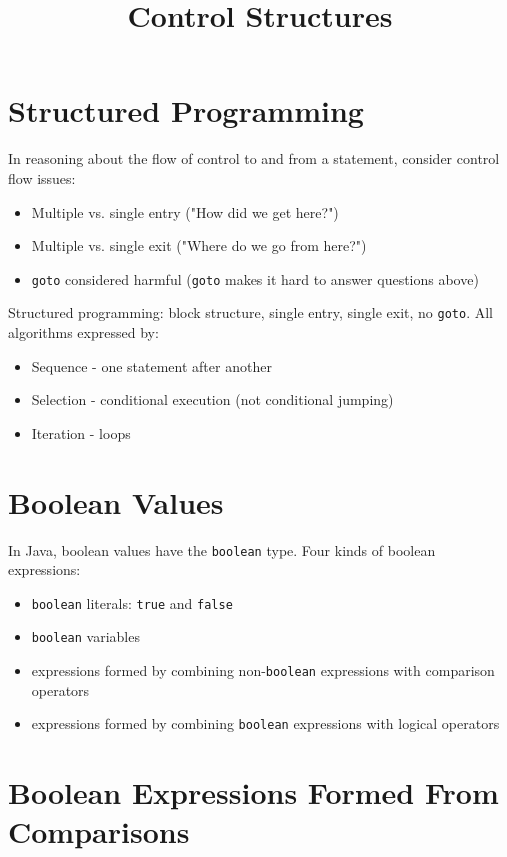 \documentclass{article}
\title{Control Structures}
\date{}
\begin{document}
\maketitle

\section{Structured Programming}


In reasoning about the flow of control to and from a statement, consider control flow issues:
\begin{itemize}
\item Multiple vs. single entry ("How did we get here?")
\item Multiple vs. single exit ("Where do we go from here?")
\item {\tt goto} considered harmful ({\tt goto} makes it hard to answer questions above)
\end{itemize}

Structured programming: block structure, single entry, single exit, no {\tt goto}.  All algorithms expressed by:
\begin{itemize}
\item Sequence - one statement after another
\item Selection - conditional execution (not conditional jumping)
\item Iteration - loops
\end{itemize}


\section{Boolean Values}


In Java, boolean values have the {\tt boolean} type.  Four kinds of boolean expressions:
\begin{itemize}
\item {\tt boolean} literals: {\tt true} and {\tt false}
\item {\tt boolean} variables
\item expressions formed by combining non-{\tt boolean} expressions with comparison operators
\item expressions formed by combining {\tt boolean} expressions with logical operators
\end{itemize}




\section{Boolean Expressions Formed From Comparisons}
\end{document}
